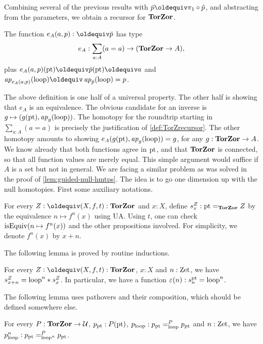 \documentclass[a4,12pt]{amsart}
\begin{document}
Combining several of the previous results with 
$\bar{p}\jdeq \pi_1 \circ \hat{p}$, and abstracting from the
parameters, we obtain a recursor for $\mathbf{TorZor}$.

\begin{definition}\label{def:TorZrecursor}
The function $e_A(a,p) \defeq \bar{p}$ has type
\[
e_A : \sum_{a:A}(a=a) \to (\mathbf{TorZor} \to A),
\]
plus $e_A(a,p)(\pt) \jdeq \bar{p}(\pt) \jdeq a$ and 
$\ap{e_A(a,p)}(\Zloop)\jdeq\ap{\bar{p}}(\Zloop) = p$.
\end{definition}

The above definition is one half of a universal property.
The other half is showing that $e_A$ is an equivalence.
The obvious candidate for an inverse is 
$g\mapsto (g({\mathord{\mathrm{pt}}}),\mathop{{\it ap}_{g}}(\mathrm{loop}))$.
The homotopy for the roundtrip starting in $\sum_{a:A}(a=a)$
is precisely the justification of \cref{def:TorZrecursor}.
The other homotopy amounts to showing
$e_A(g({\mathord{\mathrm{pt}}}),\mathop{{\it ap}_{g}}(\mathrm{loop})) = g$, for any $g:\mathbf{TorZor}\to A$.
We know already that both functions agree in ${\mathord{\mathrm{pt}}}$,
and that $\mathbf{TorZor}$ is connected, so that all function values
are merely equal. This simple argument would suffice if
$A$ is a set but not in general. We are facing a similar
problem as was solved in the proof of \cref{lem:guided-null-hmtps}.
The idea is to go one dimension up with the null homotopies.
First some auxiliary notations.

\begin{definition}\label{def:loop-s-iterated}
For every $Z\defeq(X,f,t):\TorZ$ and $x:X$, 
define $s^Z_x: {\mathord{\mathrm{pt}}} =_{\mathbf{TorZor}} Z$ by the equivalence $n\mapsto f^n(x)$ using UA. 
Using $t$, one can check $\mathrm{isEquiv}(n\mapsto f^n(x))$
and the other propositions involved. 
For simplicity, we denote $f^n(x)$ by $x+n$.
\end{definition}

The following lemma is proved by routine inductions.

\begin{lemma}\label{lem:loop-s-iterated}
For every $Z\defeq(X,f,t):\TorZ$, $x:X$ and $n:\mathrm{Zet}$, 
we have $s^Z_{x+n} = \mathrm{loop}^n * s^Z_x$. 
In particular, we have a function $\varepsilon(n): s^{\mathord{\mathrm{pt}}}_n = \mathrm{loop}^n$.
\end{lemma}

The following lemma uses pathovers and their composition, 
which should be defined somewhere else. 

\begin{lemma}\label{lem:p_loop-iterated}
For every $P:\mathbf{TorZor} \to \mathcal{U}$, $p_{\mathord{\mathrm{pt}}} : P({\mathord{\mathrm{pt}}})$, 
$p_{\mathrm{loop}} : p_{\mathord{\mathrm{pt}}} =^P_{\mathrm{loop}} p_{\mathord{\mathrm{pt}}}$ and $n:\mathrm{Zet}$, 
we have $p_{\mathrm{loop}}^n :  p_{\mathord{\mathrm{pt}}} =^P_{\mathrm{loop}^n} p_{\mathord{\mathrm{pt}}}$.
\end{lemma}
\end{document}
